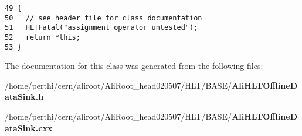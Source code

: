 \footnotesize\begin{verbatim}49 { 
50   // see header file for class documentation
51   HLTFatal("assignment operator untested");
52   return *this;
53 }
\end{verbatim}\normalsize 




The documentation for this class was generated from the following files:\begin{CompactItemize}
\item 
/home/perthi/cern/aliroot/Ali\-Root\_\-head020507/HLT/BASE/{\bf Ali\-HLTOffline\-Data\-Sink.h}\item 
/home/perthi/cern/aliroot/Ali\-Root\_\-head020507/HLT/BASE/{\bf Ali\-HLTOffline\-Data\-Sink.cxx}\end{CompactItemize}

